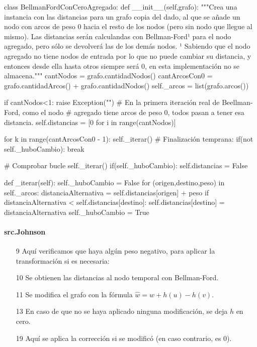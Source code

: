 \documentclass[../tp2_grupo404.tex]{subfiles}
\begin{document}
\begin{alternate}[breaklines=true,numbers=left,xleftmargin=5mm]
    class BellmanFordConCeroAgregado:
    def __init__(self,grafo):
        """Crea una instancia con las distancias para un grafo copia del
        dado, al que se añade un nodo con arcos de peso 0 hacia el resto
        de los nodos (pero sin nodo que llegue al mismo). Las distancias
        serán calculandas con Bellman-Ford¹ para el nodo agregado, pero
        sólo se devolverá las de los demás nodos.
        ¹ Sabiendo que el nodo agregado no tiene nodos de entrada por lo
        que no puede cambiar su distancia, y entonces desde ella hasta
        otros siempre será 0, en esta implementación no se almacena."""
        cantNodos = grafo.cantidadNodos()
        cantArcosCon0 = grafo.cantidadArcos() + grafo.cantidadNodos()
        self._arcos = list(grafo.arcos())

        if cantNodos<1:
            raise Exception("")
        # En la primera iteración real de Beellman-Ford, como el nodo
        # agregado tiene arcos de peso 0, todos pasan a tener esa distancia.
        self.distancias = [0 for i in range(cantNodos)]

        for k in range(cantArcosCon0 - 1):
            self._iterar()
            # Finalización temprana:
            if(not self._huboCambio):
                break

        # Comprobar bucle
        self._iterar()
        if(self._huboCambio):
            self.distancias = False

    def _iterar(self):
        self._huboCambio = False
        for (origen,destino,peso) in self._arcos:
            distanciaAlternativa = self.distancias[origen] + peso
            if distanciaAlternativa < self.distancias[destino]:
                self.distancias[destino] = distanciaAlternativa
                self._huboCambio = True
\end{alternate}

\paragraph{src.Johnson}

\begin{enumerate}
    \item[9] Aquí verificamos que haya algún peso negativo, para aplicar la transformación si es necesaria:
    \item[10] Se obtienen las distancias al nodo temporal con Bellman-Ford.
    \item[11] Se modifica el grafo con la fórmula $\hat{w} = w + h(u) - h(v)$.
    \item[13] En caso de que no se haya aplicado ninguna modificación, se deja $h$ en cero.
    \item[19] Aquí se aplica la corrección si se modificó (en caso contrario, es 0).
\end{enumerate}
\end{document}
